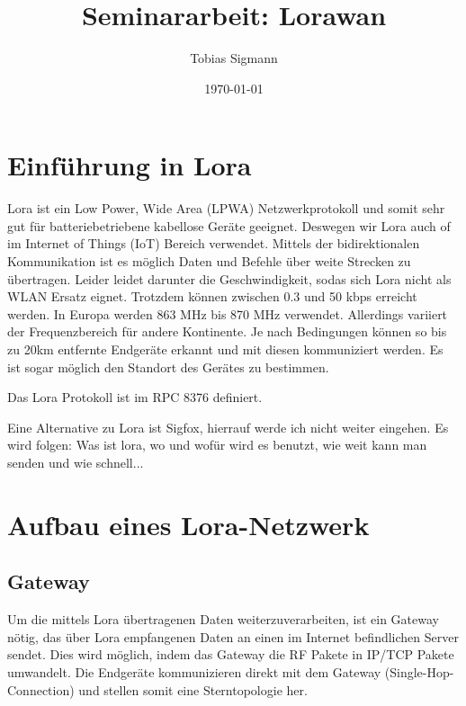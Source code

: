 \documentclass[a4paper,12pt]{article}
\author{Tobias Sigmann}
\title{Seminararbeit: Lorawan}
\date{\today}
\begin{document}
    \maketitle
    \tableofcontents
    \newpage
    \begin{abstract} 
       \cite{WhatIsLoRa}
       \cite{Semtech}
    \end{abstract}

    \section{Einführung in Lora}
    Lora ist ein Low Power, Wide Area (LPWA) Netzwerkprotokoll und somit sehr gut für batteriebetriebene kabellose Geräte geeignet. Deswegen wir Lora auch of im Internet of Things (IoT) Bereich verwendet.
    Mittels der bidirektionalen Kommunikation ist es möglich Daten und Befehle über weite Strecken zu übertragen. Leider leidet darunter die Geschwindigkeit, sodas sich Lora nicht als WLAN Ersatz eignet.
    Trotzdem können zwischen 0.3 und 50 kbps erreicht werden. In Europa werden 863 MHz bis 870 MHz verwendet. Allerdings variiert der Frequenzbereich für andere Kontinente. Je nach Bedingungen können so bis zu 20km entfernte Endgeräte erkannt und mit diesen kommuniziert werden.
    Es ist sogar möglich den Standort des Gerätes zu bestimmen.

    Das Lora Protokoll ist im RPC 8376 definiert.
    
    Eine Alternative zu Lora ist Sigfox, hierrauf werde ich nicht weiter eingehen.
        \cite{WhatIsLoRa}
        \cite{LoraLimit}
    \newline{}\newline{} Es wird folgen: Was ist lora, wo und wofür wird es benutzt, wie weit kann man senden und wie schnell...
    \section{Aufbau eines Lora-Netzwerk}
    \subsection{Gateway}
    Um die mittels Lora übertragenen Daten weiterzuverarbeiten, ist ein Gateway nötig, das über Lora empfangenen Daten an einen im Internet befindlichen Server sendet. Dies wird möglich, indem das Gateway die RF Pakete in IP/TCP Pakete umwandelt.
    Die Endgeräte kommunizieren direkt mit dem Gateway (Single-Hop-Connection) und stellen somit eine Sterntopologie her.
\end{document}
